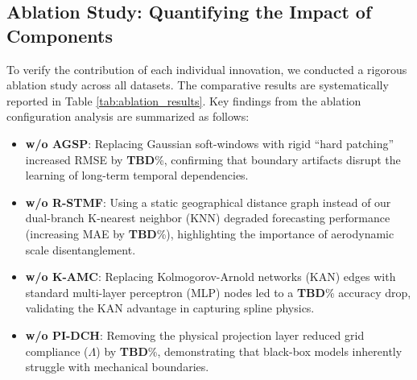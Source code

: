 \subsection{Ablation Study: Quantifying the Impact of Components}
\label{sec:ablation}
To verify the contribution of each individual innovation, we conducted a rigorous ablation study across all datasets. The comparative results are systematically reported in Table \ref{tab:ablation_results}. Key findings from the ablation configuration analysis are summarized as follows:
\begin{itemize}
    \item \textbf{w/o AGSP}: Replacing Gaussian soft-windows with rigid ``hard patching'' increased RMSE by \textbf{TBD}\%, confirming that boundary artifacts disrupt the learning of long-term temporal dependencies.
    \item \textbf{w/o R-STMF}: Using a static geographical distance graph instead of our dual-branch K-nearest neighbor (KNN) degraded forecasting performance (increasing MAE by \textbf{TBD}\%), highlighting the importance of aerodynamic scale disentanglement.
    \item \textbf{w/o K-AMC}: Replacing Kolmogorov-Arnold networks (KAN) edges with standard multi-layer perceptron (MLP) nodes led to a \textbf{TBD}\% accuracy drop, validating the KAN advantage in capturing spline physics.
    \item \textbf{w/o PI-DCH}: Removing the physical projection layer reduced grid compliance ($\Lambda$) by \textbf{TBD}\%, demonstrating that black-box models inherently struggle with mechanical boundaries.
\end{itemize}

